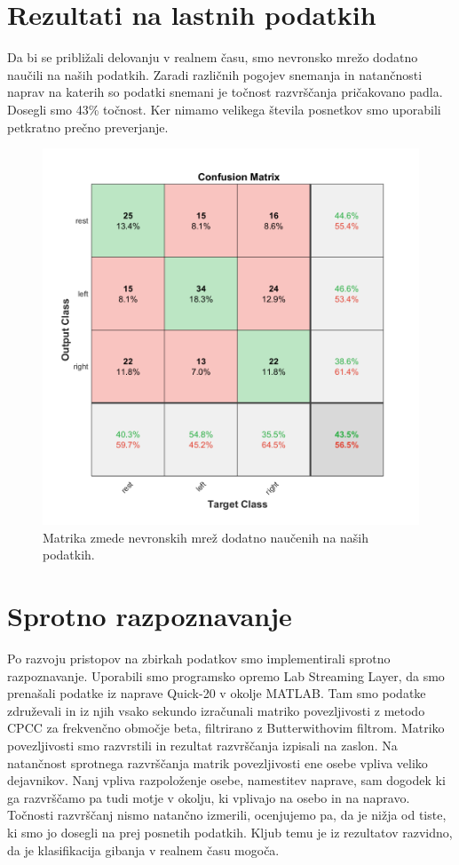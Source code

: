 \section{Rezultati na lastnih podatkih}
Da bi se približali delovanju v realnem času, smo nevronsko mrežo dodatno naučili na naših podatkih. Zaradi različnih pogojev snemanja in natančnosti naprav na katerih so podatki snemani je točnost razvrščanja pričakovano padla. Dosegli smo 43\% točnost. Ker nimamo velikega števila posnetkov smo uporabili petkratno prečno preverjanje. 
\begin{figure}
\begin{center}
\includegraphics[width=0.8\linewidth]{slike/Confusion_13-20Hz_0s-4s_retrained.png}
\end{center}
\caption[Matrika zmede dodatno naučene nevronske mreže.]{Matrika zmede nevronskih mrež dodatno naučenih na naših podatkih.}
\end{figure}


\section{Sprotno razpoznavanje}
Po razvoju pristopov na zbirkah podatkov smo implementirali sprotno razpoznavanje. Uporabili smo programsko opremo Lab Streaming Layer, da smo prenašali podatke iz naprave Quick-20 v okolje MATLAB. Tam smo podatke združevali in iz njih vsako sekundo izračunali matriko povezljivosti z metodo CPCC za frekvenčno območje beta, filtrirano z Butterwithovim filtrom. Matriko povezljivosti smo razvrstili in rezultat razvrščanja izpisali na zaslon. Na natančnost sprotnega razvrščanja matrik povezljivosti ene osebe vpliva veliko dejavnikov. Nanj vpliva razpoloženje osebe, namestitev naprave, sam dogodek ki ga razvrščamo pa tudi motje v okolju, ki vplivajo na osebo in na napravo. Točnosti razvrščanj nismo natančno izmerili, ocenjujemo pa, da je nižja od tiste, ki smo jo dosegli na prej posnetih podatkih. Kljub temu je iz rezultatov razvidno, da je klasifikacija gibanja v realnem času mogoča.

